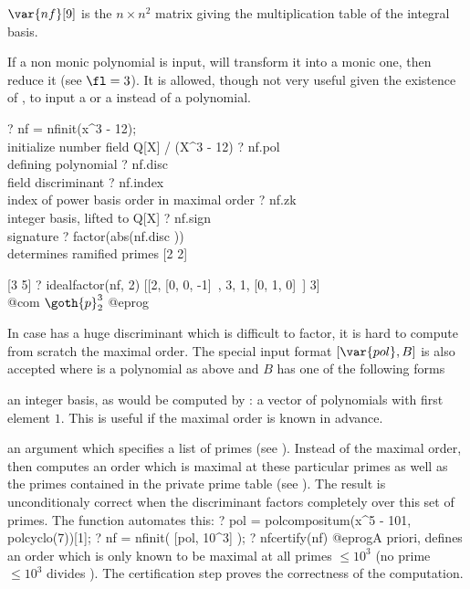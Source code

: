 $\var{nf}[9]$ is the $n\times n^2$ matrix giving the multiplication table
of the integral basis.

If a non monic polynomial is input,  will transform it into a
monic one, then reduce it (see $\fl=3$). It is allowed, though not very
useful given the existence of , to input a  or a
 instead of a polynomial.

\bprog
? nf = nfinit(x^3 - 12); \\ initialize number field Q[X] / (X^3 - 12)
? nf.pol   \\ defining polynomial
? nf.disc  \\ field discriminant
? nf.index \\ index of power basis order in maximal order
? nf.zk    \\ integer basis, lifted to Q[X]
? nf.sign  \\ signature
? factor(abs(nf.disc ))  \\ determines ramified primes
[2 2]

[3 5]
? idealfactor(nf, 2)
[[2, [0, 0, -1]~, 3, 1, [0, 1, 0]~] 3]  \\ @com $\goth{p}_2^3$
@eprog


In case  has a huge discriminant which is difficult to factor,
it is hard to compute from scratch the maximal order. The special input
format $[\var{pol}, B]$ is also accepted where  is a polynomial as
above and $B$ has one of the following forms

\item an integer basis, as would be computed by : a vector of
polynomials with first element $1$. This is useful if the maximal order is
known in advance.

\item an argument  which specifies a list of primes (see
). Instead of the maximal order,  then computes an
order which is maximal at these particular primes as well as the primes
contained in the private prime table (see ). The result is
unconditionaly correct when the discriminant  factors
completely over this set of primes. The function  automates
this:
\bprog
? pol = polcompositum(x^5 - 101, polcyclo(7))[1];
? nf = nfinit( [pol, 10^3] );
? nfcertify(nf)
@eprog\noindent A priori,  defines an order which is only known
to be maximal at all primes $\leq 10^3$ (no prime $\leq 10^3$ divides
). The certification step proves the correctness of the
computation.
\medskip

